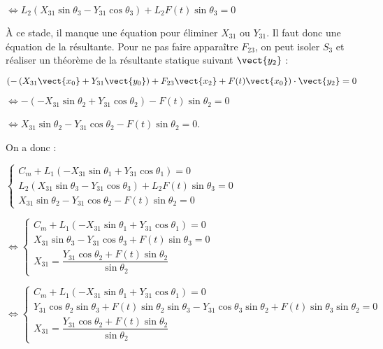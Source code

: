 \begin{corrige}
$\Leftrightarrow L_2\left(X_{31} \sin \theta_3-Y_{31}\cos \theta_3 \right)  +L_2 F(t)\sin\theta_3=0$

À ce stade, il manque une équation pour éliminer $X_{31}$ ou $Y_{31}$. Il faut donc une équation de la résultante. Pour ne pas faire apparaître $F_{23}$, on peut isoler $S_3$ et réaliser un théorème de la résultante statique suivant $\vect{y_2}$ :

$\left(-\left(X_{31}\vect{x_0}+Y_{31}\vect{y_0} \right) +F_{23}\vect{x_2}+F(t)\vect{x_0}\right) \cdot \vect{y_2}=0$

$\Leftrightarrow -\left(- X_{31}\sin \theta_2+Y_{31}\cos\theta_2 \right)- F(t)\sin \theta_2=0$

$\Leftrightarrow  X_{31}\sin \theta_2-Y_{31}\cos\theta_2- F(t)\sin \theta_2=0$.

On a donc : 

$\left\{\begin{array}{l}
 C_m + L_1\left(-X_{31}\sin \theta_1+Y_{31} \cos \theta_1 \right) =0 \\
 L_2\left(X_{31} \sin \theta_3-Y_{31}\cos \theta_3 \right)  +L_2 F(t)\sin\theta_3=0 \\
 X_{31}\sin \theta_2-Y_{31}\cos\theta_2- F(t)\sin \theta_2=0
\end{array}
\right.
$

$\Leftrightarrow \left\{\begin{array}{l}
 C_m + L_1\left(-X_{31}\sin \theta_1+Y_{31} \cos \theta_1 \right) =0 \\
X_{31} \sin \theta_3-Y_{31}\cos \theta_3  + F(t)\sin\theta_3=0 \\
 X_{31} = \dfrac{Y_{31}\cos\theta_2+ F(t)\sin \theta_2}{\sin \theta_2}
\end{array}
\right.
$
%

$\Leftrightarrow \left\{\begin{array}{l}
 C_m + L_1\left(-X_{31}\sin \theta_1+Y_{31} \cos \theta_1 \right) =0 \\
Y_{31}\cos\theta_2\sin \theta_3+ F(t)\sin \theta_2 \sin \theta_3-Y_{31}\cos \theta_3\sin \theta_2   +F(t)\sin\theta_3\sin \theta_2=0 \\
 X_{31} = \dfrac{Y_{31}\cos\theta_2+ F(t)\sin \theta_2}{\sin \theta_2}
\end{array}
\right.
$


\end{corrige}
